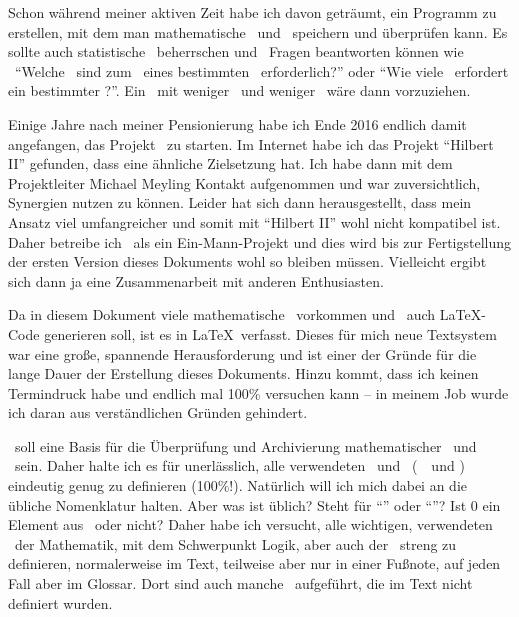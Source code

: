 Schon während meiner aktiven Zeit habe ich davon geträumt, ein Programm zu erstellen, mit dem man mathematische \Saetze\ und \Beweise\ speichern und überprüfen kann.
Es sollte auch statistische \Auswertungen\ beherrschen und \textua\ Fragen beantworten können wie \textzB\
"`Welche \Axiome\ sind zum \Beweis\ eines bestimmten \Satzes\ erforderlich?"' oder
"`Wie viele \Beweisschritte\ erfordert ein bestimmter \Beweis?"'.
Ein \Beweis\ mit weniger \Axiomen\ und weniger \Beweisschritten\ wäre dann vorzuziehen.

Einige Jahre nach meiner Pensionierung habe ich Ende 2016 endlich damit angefangen, das Projekt \ASBA\ zu starten.
Im Internet habe ich das Projekt "`Hilbert II"' \cite{bib:HilbertII} gefunden, dass eine ähnliche Zielsetzung hat.
Ich habe dann mit dem Projektleiter Michael Meyling Kontakt aufgenommen und war zuversichtlich, Synergien nutzen zu können.
Leider hat sich dann herausgestellt, dass mein Ansatz viel umfangreicher und somit mit "`Hilbert II"' wohl nicht kompatibel ist.
Daher betreibe ich \ASBA\ als ein Ein-Mann-Projekt und dies wird bis zur Fertigstellung der ersten Version dieses Dokuments wohl so bleiben müssen.
Vielleicht ergibt sich dann ja eine Zusammenarbeit mit anderen Enthusiasten.

Da in diesem Dokument viele mathematische \Formeln\ vorkommen und \ASBA\ auch \LaTeX-Code generieren soll, ist es in \LaTeX\ verfasst.
Dieses für mich neue Textsystem war eine große, spannende Herausforderung und ist einer der Gründe für die lange Dauer der Erstellung dieses Dokuments.
Hinzu kommt, dass ich keinen Termindruck habe und endlich mal 100\% versuchen kann -- in meinem Job wurde ich daran aus verständlichen Gründen gehindert.

\ASBA\ soll eine Basis für die Überprüfung und Archivierung mathematischer \Saetze\ und \Beweise\ sein.
Daher halte ich es für unerlässlich, alle verwendeten \Begriffe\ und \Bezeichnungen\ (\textdh\ \Benennungen\ und \Symbole) eindeutig genug zu definieren (100\%!).
Natürlich will ich mich dabei an die übliche Nomenklatur halten.
Aber was ist üblich?
Steht \chrqt{\MtsSubset} für "`\Teilmenge"' oder "`\echteTeilmenge"'?
Ist $0$ ein Element aus \MtsIN\ oder nicht?
Daher habe ich versucht, alle wichtigen, verwendeten \Bezeichnungen\ der Mathematik, mit dem Schwerpunkt Logik, aber auch der \formalenMetasprache\ streng zu definieren, normalerweise im Text, teilweise aber nur in einer Fußnote, auf jeden Fall aber im Glossar.
Dort sind auch manche \Bezeichnungen\ aufgeführt, die im Text nicht definiert wurden.

